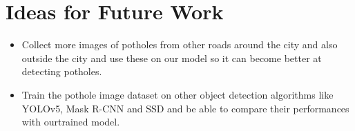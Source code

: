 \documentclass[12pt]{report}
\begin{document}
\section{Ideas for Future Work}
\begin{itemize}[topsep=0pt]

\item Collect more images of potholes from other roads around the city and also outside the city and use these on our model so it can become better at detecting potholes.

\item Train the pothole image dataset on other object detection algorithms like YOLOv5, Mask R-CNN and SSD and be able to compare their performances with ourtrained model.

\end{itemize}













%


\end{document}

